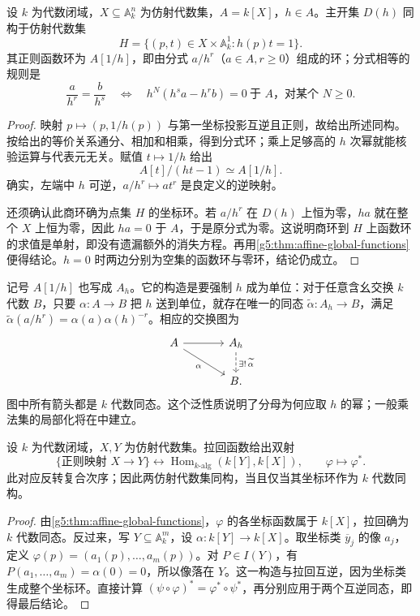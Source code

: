 \begin{proposition}\label{g5:prop:principal-open-affine}
	设 \(k\) 为代数闭域，\(X\subseteq\mathbb A_k^n\) 为仿射代数集，\(A=k[X]\)，\(h\in A\)。主开集 \(D(h)\) 同构于仿射代数集
	\[
		H=\{(p,t)\in X\times\mathbb A_k^1:h(p)t=1\}.
	\]
	其正则函数环为 \(A[1/h]\)，即由分式 \(a/h^r\)（\(a\in A,r\ge0\)）组成的环；分式相等的规则是
	\[
		\frac a{h^r}=\frac b{h^s}
		\quad\Longleftrightarrow\quad
		h^N(h^s a-h^r b)=0\ \text{于 }A\text{，对某个 }N\ge0.
	\]
\end{proposition}
\begin{proof}
	映射 \(p\mapsto(p,1/h(p))\) 与第一坐标投影互逆且正则，故给出所述同构。按给出的等价关系通分、相加和相乘，得到分式环；乘上足够高的 \(h\) 次幂就能核验运算与代表元无关。赋值 \(t\mapsto1/h\) 给出
	\[
		A[t]/(ht-1)\simeq A[1/h].
	\]
	确实，左端中 \(h\) 可逆，\(a/h^r\mapsto at^r\) 是良定义的逆映射。

	还须确认此商环确为点集 \(H\) 的坐标环。若 \(a/h^r\) 在 \(D(h)\) 上恒为零，\(ha\) 就在整个 \(X\) 上恒为零，因此 \(ha=0\) 于 \(A\)，于是原分式为零。这说明商环到 \(H\) 上函数环的求值是单射，即没有遗漏额外的消失方程。再用\cref{g5:thm:affine-global-functions}便得结论。\(h=0\) 时两边分别为空集的函数环与零环，结论仍成立。
\end{proof}

记号 \(A[1/h]\) 也写成 \(A_h\)。它的构造是要强制 \(h\) 成为单位：对于任意含幺交换 \(k\) 代数 \(B\)，只要 \(\alpha:A\rightarrow B\) 把 \(h\) 送到单位，就存在唯一的同态 \(\widetilde\alpha:A_h\rightarrow B\)，满足 \(\widetilde\alpha(a/h^r)=\alpha(a)\alpha(h)^{-r}\)。相应的交换图为
\[
	\begin{tikzcd}[column sep=large]
		A \arrow[r] \arrow[dr,"\alpha"'] & A_h \arrow[d,dashed,"\exists!\,\widetilde\alpha"] \\
		& B .
	\end{tikzcd}
\]
图中所有箭头都是 \(k\) 代数同态。这个泛性质说明了分母为何应取 \(h\) 的幂；一般乘法集的局部化将在中建立。

\begin{theorem}\label{g5:thm:affine-morphism-correspondence}
	设 \(k\) 为代数闭域，\(X,Y\) 为仿射代数集。拉回函数给出双射
	\[
		\{\text{正则映射 }X\rightarrow Y\}
		\longleftrightarrow
		\operatorname{Hom}_{k\text{-alg}}(k[Y],k[X]),\qquad
		\varphi\longmapsto\varphi^*.
	\]
	此对应反转复合次序；因此两仿射代数集同构，当且仅当其坐标环作为 \(k\) 代数同构。
\end{theorem}
\begin{proof}
	由\cref{g5:thm:affine-global-functions}，\(\varphi\) 的各坐标函数属于 \(k[X]\)，拉回确为 \(k\) 代数同态。反过来，写 \(Y\subseteq\mathbb A_k^m\)，设 \(\alpha:k[Y]\rightarrow k[X]\)。取坐标类 \(\overline y_j\) 的像 \(a_j\)，定义 \(\varphi(p)=(a_1(p),\ldots,a_m(p))\)。对 \(P\in I(Y)\)，有 \(P(a_1,\ldots,a_m)=\alpha(0)=0\)，所以像落在 \(Y\)。这一构造与拉回互逆，因为坐标类生成整个坐标环。直接计算 \((\psi\circ\varphi)^*=\varphi^*\circ\psi^*\)，再分别应用于两个互逆同态，即得最后结论。
\end{proof}

